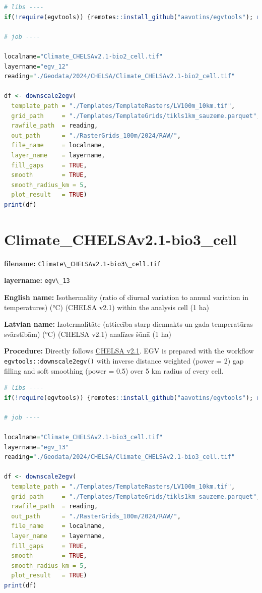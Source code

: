 \documentclass[
]{book}
\newcommand{\passthrough}[1]{#1}
\begin{document}
\begin{lstlisting}[language=R]
# libs ----
if(!require(egvtools)) {remotes::install_github("aavotins/egvtools"); require(egvtools)}

# job ----

localname="Climate_CHELSAv2.1-bio2_cell.tif"
layername="egv_12"
reading="./Geodata/2024/CHELSA/Climate_CHELSAv2.1-bio2_cell.tif"

df <- downscale2egv(
  template_path = "./Templates/TemplateRasters/LV100m_10km.tif",
  grid_path     = "./Templates/TemplateGrids/tikls1km_sauzeme.parquet",
  rawfile_path  = reading,
  out_path      = "./RasterGrids_100m/2024/RAW/",
  file_name     = localname,
  layer_name    = layername,
  fill_gaps     = TRUE,
  smooth        = TRUE,
  smooth_radius_km = 5,
  plot_result   = TRUE)
print(df)
\end{lstlisting}

\section{Climate\_CHELSAv2.1-bio3\_cell}\label{ch06.013}

\textbf{filename:} \passthrough{\lstinline!Climate\_CHELSAv2.1-bio3\_cell.tif!}

\textbf{layername:} \passthrough{\lstinline!egv\_13!}

\textbf{English name:} Isothermality (ratio of diurnal variation to annual variation in temperatures) (°C) (CHELSA v2.1) within the analysis cell (1 ha)

\textbf{Latvian name:} Izotermalitāte (attiecība starp diennakts un gada temperatūras svārstībām) (°C) (CHELSA v2.1) analīzes šūnā (1 ha)

\textbf{Procedure:} Directly follows \hyperref[Ch04.11]{CHELSA v2.1}. EGV is prepared with the
workflow \passthrough{\lstinline!egvtools::downscale2egv()!} with inverse distance weighted (power = 2)
gap filling and soft smoothing (power = 0.5) over 5 km radius of every cell.

\begin{lstlisting}[language=R]
# libs ----
if(!require(egvtools)) {remotes::install_github("aavotins/egvtools"); require(egvtools)}

# job ----

localname="Climate_CHELSAv2.1-bio3_cell.tif"
layername="egv_13"
reading="./Geodata/2024/CHELSA/Climate_CHELSAv2.1-bio3_cell.tif"

df <- downscale2egv(
  template_path = "./Templates/TemplateRasters/LV100m_10km.tif",
  grid_path     = "./Templates/TemplateGrids/tikls1km_sauzeme.parquet",
  rawfile_path  = reading,
  out_path      = "./RasterGrids_100m/2024/RAW/",
  file_name     = localname,
  layer_name    = layername,
  fill_gaps     = TRUE,
  smooth        = TRUE,
  smooth_radius_km = 5,
  plot_result   = TRUE)
print(df)
\end{lstlisting}
\end{document}
